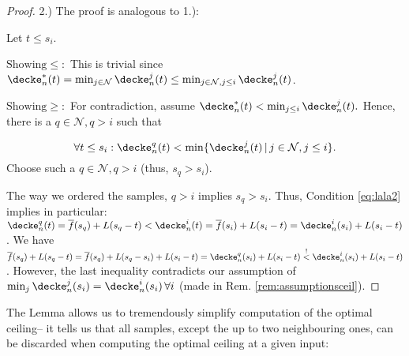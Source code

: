 \begin{lem}
\begin{proof}
2.) The proof is analogous to 1.):

Let $t \leq s_i$. 

$\text{Showing} \leq:$ This is trivial since $\decke_n^*(t) = \min_{j \in \mathcal N} \decke_n^j(t) \leq \min_{j \in \mathcal N, j \leq i}\decke_n^j(t)$. 


$\text{Showing} \geq:$ For contradiction, assume $\decke_n^* ( t) < \min_{j\leq i} \decke_n^j(t).$ 
Hence, there is a $q \in \mathcal N, q > i$ such that 

\begin{equation}
\label{eq:lala2}
\forall t \leq s_i: \decke_n^q(t) < \min\{  \decke_n^j (t) \,\vert \, j \in \mathcal N, j \leq i\}.
\end{equation}
%
Choose such a $q \in \mathcal N , q > i$ (thus, $s_q > s_i$).


The way we ordered the samples, $q>i$ implies $s_q > s_{i}$. Thus, Condition \ref{eq:lala2} implies in particular: $\decke_n^q(t) =\overline f(s_q) + L (s_q -t ) < \decke_n^i(t) = \overline f(s_{i}) + L ( s_{i} -t) = \decke_n^{i}(s_{i}) + L ( s_{i} -t)$. We have $\overline f(s_q) + L (s_q-t) = \overline f(s_q) + L (s_q - s_{i} ) + L (s_{i} - t) = \decke_n^q(s_{i}) + L (s_{i} - t) \stackrel{!}{ <} \decke_n^{i}(s_{i}) + L (s_{i} -t) $. However, the last inequality contradicts our assumption of $\min_j \decke_n^j(s_i) =\decke_n^i(s_i)\,\forall i$ (made in Rem. \ref{rem:assumptionsceil}).



\end{proof}

\end{lem}


The Lemma allows us to tremendously simplify computation of the optimal ceiling-- it tells us that all samples, except the up to two neighbouring ones, can be discarded when computing the optimal ceiling at a given input:

